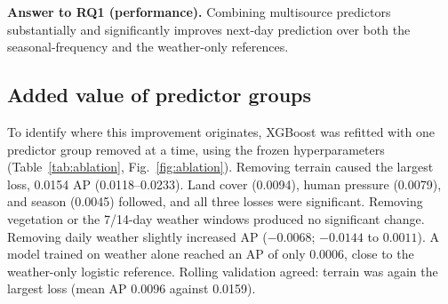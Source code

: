 \documentclass[pdflatex,sn-mathphys-num]{sn-jnl}
\begin{document}
\textbf{Answer to RQ1 (performance).} Combining multisource predictors substantially and significantly improves next-day prediction over both the seasonal-frequency and the weather-only references.

\subsection{Added value of predictor groups}\label{sec:res_ablation}

To identify where this improvement originates, XGBoost was refitted with one predictor group removed at a time, using the frozen hyperparameters (Table~\ref{tab:ablation}, Fig.~\ref{fig:ablation}). Removing terrain caused the largest loss, 0.0154 AP (0.0118--0.0233). Land cover (0.0094), human pressure (0.0079), and season (0.0045) followed, and all three losses were significant. Removing vegetation or the 7/14-day weather windows produced no significant change. Removing daily weather slightly increased AP ($-0.0068$; $-0.0144$ to $0.0011$). A model trained on weather alone reached an AP of only 0.0006, close to the weather-only logistic reference. Rolling validation agreed: terrain was again the largest loss (mean AP 0.0096 against 0.0159).
\end{document}
